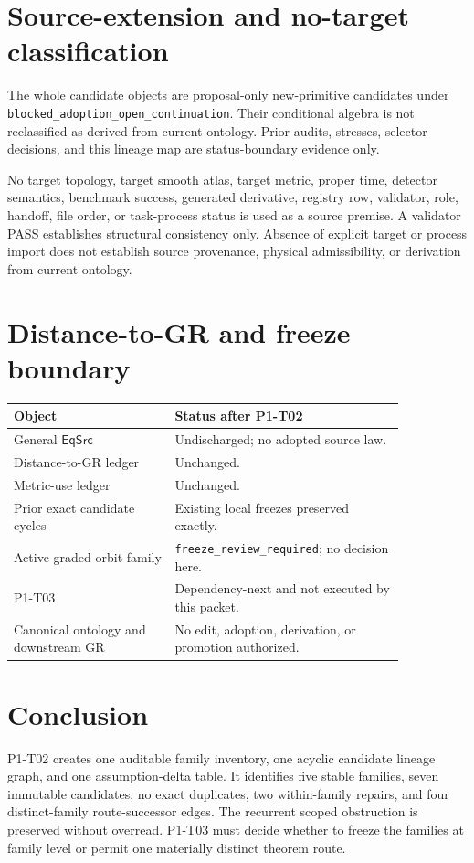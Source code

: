 \documentclass[11pt]{article}
\begin{document}
\section{Source-extension and no-target classification}

The whole candidate objects are proposal-only new-primitive candidates under
\texttt{blocked\_adoption\_open\_continuation}. Their conditional algebra is
not reclassified as derived from current ontology. Prior audits, stresses,
selector decisions, and this lineage map are status-boundary evidence only.

No target topology, target smooth atlas, target metric, proper time, detector
semantics, benchmark success, generated derivative, registry row, validator,
role, handoff, file order, or task-process status is used as a source premise.
A validator PASS establishes structural consistency only. Absence of explicit
target or process import does not establish source provenance, physical
admissibility, or derivation from current ontology.

\section{Distance-to-GR and freeze boundary}

\begin{center}
\begin{tabular}{p{0.35\linewidth}p{0.5\linewidth}}
\toprule
Object & Status after P1-T02 \\
\midrule
General $\mathsf{EqSrc}$ & Undischarged; no adopted source law. \\
Distance-to-GR ledger & Unchanged. \\
Metric-use ledger & Unchanged. \\
Prior exact candidate cycles & Existing local freezes preserved exactly. \\
Active graded-orbit family & \texttt{freeze\_review\_required}; no decision here. \\
P1-T03 & Dependency-next and not executed by this packet. \\
Canonical ontology and downstream GR & No edit, adoption, derivation, or promotion authorized. \\
\bottomrule
\end{tabular}
\end{center}

\section{Conclusion}

P1-T02 creates one auditable family inventory, one acyclic candidate lineage
graph, and one assumption-delta table. It identifies five stable families,
seven immutable candidates, no exact duplicates, two within-family repairs,
and four distinct-family route-successor edges. The recurrent scoped
obstruction is preserved without overread. P1-T03 must decide whether to
freeze the families at family level or permit one materially distinct theorem
route.
\end{document}
